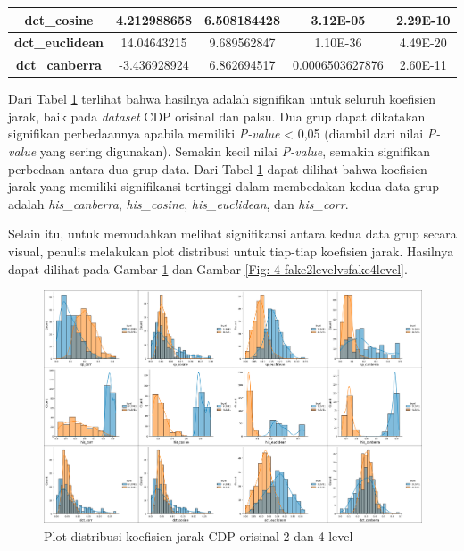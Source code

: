 \begin{table}[!ht]
\begin{tabular}{|c|cc|cc|}
		\textbf{dct\_cosine}    & \multicolumn{1}{c|}{4.212988658}          & 6.508184428                           & \multicolumn{1}{c|}{3.12E-05}          & 2.29E-10       \\ \hline
		\textbf{dct\_euclidean} & \multicolumn{1}{c|}{14.04643215}          & 9.689562847                           & \multicolumn{1}{c|}{1.10E-36}          & 4.49E-20       \\ \hline
		\textbf{dct\_canberra}  & \multicolumn{1}{c|}{-3.436928924}         & 6.862694517                           & \multicolumn{1}{c|}{0.0006503627876}   & 2.60E-11       \\ \hline
	\end{tabular}
	\label{Tab: 4-hasilujisignifikansi2vs4level}
\end{table}

Dari Tabel \ref{Tab: 4-hasilujisignifikansi2vs4level} terlihat bahwa hasilnya adalah signifikan untuk seluruh koefisien jarak, baik pada \emph{dataset} CDP
orisinal dan palsu. Dua grup dapat dikatakan signifikan perbedaannya apabila memiliki \emph{P-value} < 0,05 (diambil dari nilai \emph{P-value} yang sering
digunakan). Semakin kecil nilai \emph{P-value}, semakin signifikan perbedaan antara dua grup data. Dari Tabel \ref{Tab: 4-hasilujisignifikansi2vs4level} dapat
dilihat bahwa koefisien jarak yang memiliki signifikansi tertinggi dalam membedakan kedua data grup adalah \emph{his\_canberra}, \emph{his\_cosine},
\emph{his\_euclidean}, dan \emph{his\_corr}.

Selain itu, untuk memudahkan melihat signifikansi antara kedua data grup secara visual, penulis melakukan plot distribusi untuk tiap-tiap koefisien jarak.
Hasilnya dapat dilihat pada Gambar \ref{Fig: 4-ori2levelvsori4level} dan Gambar \ref{Fig: 4-fake2levelvsfake4level}.

\begin{figure}[!h]
	\centering
	\includegraphics[width=\textwidth]{contents/chapter-4/4-ori2levelvsori4level.png}
	\caption{Plot distribusi koefisien jarak CDP orisinal 2 dan 4 level}
	\label{Fig: 4-ori2levelvsori4level}
\end{figure}

